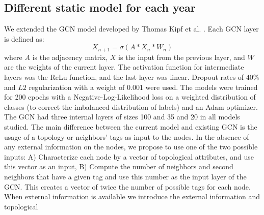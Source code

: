 \subsection {Different static model for each year}
We extended the GCN model developed by Thomas Kipf et al. \cite{kipf2016semi}. Each GCN layer is defined as: $$X_{n+1}=\sigma(A*X_{n}*W_n)$$ where $A$ is the adjacency matrix, $X$ is the input from the previous layer, and $W$ are the weights of the current layer. The activation function for intermediate layers was the ReLu function, and the last layer was linear. Dropout rates of 40\% and $L2$ regularization with a weight of 0.001 were used. The models were trained for 200 epochs with a Negative-Log-Likelihood loss on a weighted distribution of classes (to correct the imbalanced distribution of labels) and an Adam optimizer. The GCN had three internal layers of sizes 100 and 35 and 20 in all models studied. The main difference between the current model and existing GCN is the usage of a topology or neighbors' tags as input to the nodes. In the absence of any external information on the nodes, we propose to use one of the two possible inputs: A) Characterize each node by a vector of topological attributes, and use this vector as an input, B) Compute the number of neighbors and second neighbors that have a given tag and use this number as the input layer of the GCN. This creates a vector of twice the number of possible tags for each node. When external information is available we introduce the external information and topological



